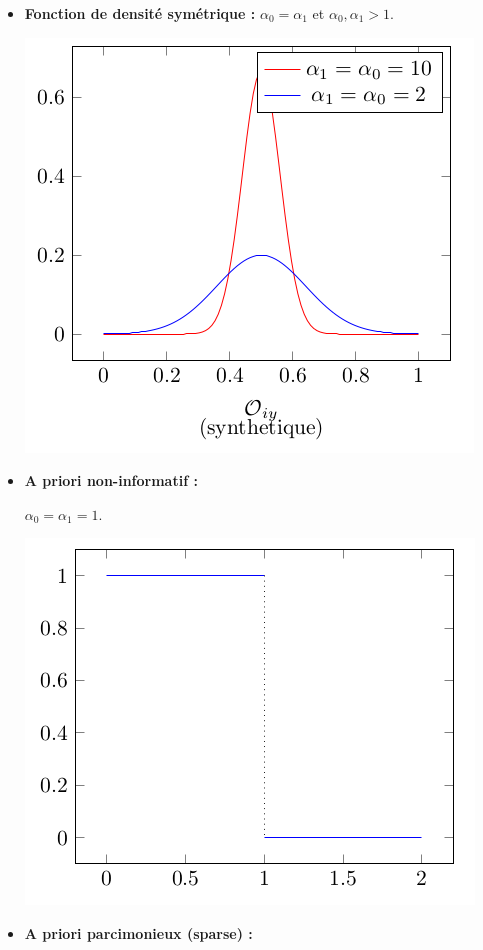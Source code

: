 \documentclass{article}
\begin{document}
\begin{itemize}
\item \textbf{Fonction de densité symétrique : }
$\alpha_0 = \alpha_1$ et $\alpha_0, \alpha_1 > 1$.

\includegraphics[scale=0.4]{schema1.png}

\item \textbf{A priori non-informatif : }

$\alpha_0 = \alpha_1 = 1$.

\includegraphics[scale=0.4]{schema2.png}

\item \textbf{A priori parcimonieux (sparse) : }


\end{itemize}
\end{document}
